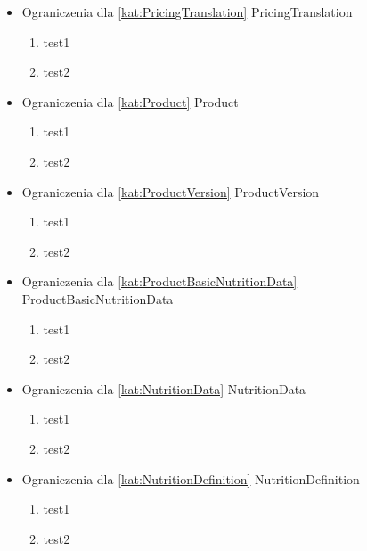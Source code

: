 \begin{itemize}[label={}]
\begin{enumerate}[label={\textbf{OGR/\protect\threedigits{\arabic{enumi}}}}, wide, labelwidth=!, resume]
    \end{enumerate}
    \item Ograniczenia dla \ref{kat:PricingTranslation} PricingTranslation
    \begin{enumerate}[label={\textbf{OGR/\protect\threedigits{\arabic{enumi}}}}, wide, labelwidth=!, resume]
        \item test1
        \item test2
    \end{enumerate}
    \item Ograniczenia dla \ref{kat:Product} Product
    \begin{enumerate}[label={\textbf{OGR/\protect\threedigits{\arabic{enumi}}}}, wide, labelwidth=!, resume]
        \item test1
        \item test2
    \end{enumerate}
    \item Ograniczenia dla \ref{kat:ProductVersion} ProductVersion
    \begin{enumerate}[label={\textbf{OGR/\protect\threedigits{\arabic{enumi}}}}, wide, labelwidth=!, resume]
        \item test1
        \item test2
    \end{enumerate}
    \item Ograniczenia dla \ref{kat:ProductBasicNutritionData} ProductBasicNutritionData
    \begin{enumerate}[label={\textbf{OGR/\protect\threedigits{\arabic{enumi}}}}, wide, labelwidth=!, resume]
        \item test1
        \item test2
    \end{enumerate}
    \item Ograniczenia dla \ref{kat:NutritionData} NutritionData
    \begin{enumerate}[label={\textbf{OGR/\protect\threedigits{\arabic{enumi}}}}, wide, labelwidth=!, resume]
        \item test1
        \item test2
    \end{enumerate}
    \item Ograniczenia dla \ref{kat:NutritionDefinition} NutritionDefinition
    \begin{enumerate}[label={\textbf{OGR/\protect\threedigits{\arabic{enumi}}}}, wide, labelwidth=!, resume]
        \item test1
        \item test2

\end{enumerate}
\end{itemize}

